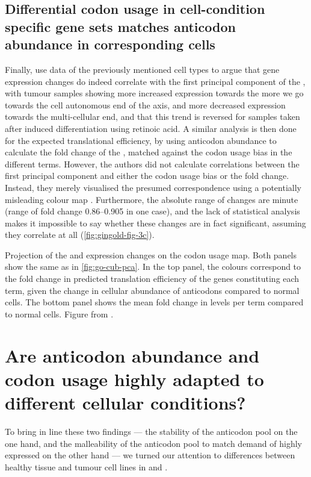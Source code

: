 \subsection{Differential codon usage in cell-condition specific gene sets
matches  anticodon abundance in corresponding cells}

Finally, \citet{Gingold:2014} use \rnaseq data of the previously mentioned cell
types to argue that gene expression changes do indeed correlate with the first
principal component of the \pca, with tumour samples showing more increased
expression towards the more we go towards the cell autonomous end of the axis,
and more decreased expression towards the multi-cellular end, and that this
trend is reversed for samples taken after induced differentiation using retinoic
acid. A similar analysis is then done for the expected translational efficiency,
by using \trna anticodon abundance to calculate the fold change of the \tai,
matched against the codon usage bias in the different \go terms. However, the
authors did not calculate correlations between the first principal component and
either the codon usage bias or the \tai fold change. Instead, they merely
visualised the presumed correspondence using a potentially misleading colour map
\citep{Borland:2007}. Furthermore, the absolute range of changes are minute
(range of \tai fold change \numrange{0.86}{0.905} in one case), and the lack of
statistical analysis makes it impossible to say whether these changes are in
fact significant, assuming they correlate at all (\cref{fig:gingold-fig-3c}).

    {Projection of the \trna and \mrna expression changes on the codon usage
    map.}
    {Both panels show the same \pca as in \cref{fig:go-cub-pca}. In the top
    panel, the colours correspond to the fold change in predicted translation
    efficiency of the genes constituting each \go term, given the change in
    cellular abundance of \trna anticodons compared to normal cells. The bottom
    panel shows the mean fold change in \mrna levels per \go term compared to
    normal cells. Figure from \citet{Gingold:2014}.}

\section{Are  anticodon abundance and codon usage highly adapted to
different cellular conditions?}

To bring in line these two findings — the stability of the anticodon pool on the
one hand, and the malleability of the anticodon pool to match demand of highly
expressed on the other hand — we turned our attention to differences between
healthy tissue and tumour cell lines in \mmu and \hsa.

